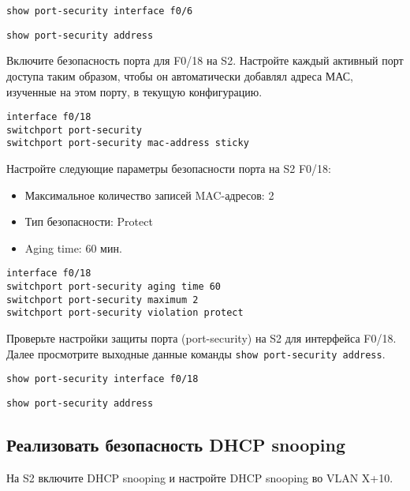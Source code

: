 \begin{verbatim}
show port-security interface f0/6
\end{verbatim}

\begin{verbatim}
show port-security address
\end{verbatim}


Включите безопасность порта для F0/18 на S2.
Настройте каждый активный порт доступа таким образом,
чтобы он автоматически добавлял адреса МАС, изученные на этом порту,
в текущую конфигурацию.

\begin{verbatim}
interface f0/18
switchport port-security
switchport port-security mac-address sticky
\end{verbatim}

Настройте следующие параметры безопасности порта на S2 F0/18:

\begin{itemize}
    \item Максимальное количество записей MAC-адресов: 2
    \item Тип безопасности: Protect
    \item Aging time: 60 мин.
\end{itemize}

\begin{verbatim}
interface f0/18
switchport port-security aging time 60
switchport port-security maximum 2
switchport port-security violation protect
\end{verbatim}

Проверьте настройки защиты порта (port-security)
на S2 для интерфейса F0/18. Далее просмотрите выходные
данные команды \texttt{show port-security address}.

\begin{verbatim}
show port-security interface f0/18
\end{verbatim}

\begin{verbatim}
show port-security address
\end{verbatim}


\subsection{Реализовать безопасность DHCP snooping}

На S2 включите DHCP snooping и настройте DHCP snooping во VLAN X+10.


